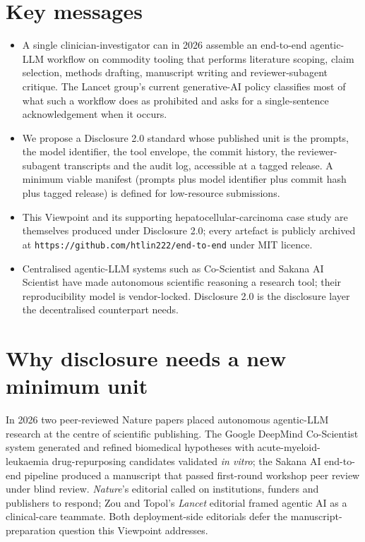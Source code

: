 \documentclass[11pt,a4paper]{article}
\begin{document}
\section*{Key messages}
\begin{tcolorbox}[colback=gray!5,colframe=gray!40,boxsep=2pt,left=6pt,right=6pt,top=4pt,bottom=4pt]
\begin{itemize}\setlength\itemsep{0.1em}
  \item A single clinician-investigator can in 2026 assemble an end-to-end agentic-LLM workflow on commodity tooling that performs literature scoping, claim selection, methods drafting, manuscript writing and reviewer-subagent critique. The Lancet group's current generative-AI policy classifies most of what such a workflow does as prohibited and asks for a single-sentence acknowledgement when it occurs.
  \item We propose a Disclosure 2.0 standard whose published unit is the prompts, the model identifier, the tool envelope, the commit history, the reviewer-subagent transcripts and the audit log, accessible at a tagged release. A minimum viable manifest (prompts plus model identifier plus commit hash plus tagged release) is defined for low-resource submissions.
  \item This Viewpoint and its supporting hepatocellular-carcinoma case study are themselves produced under Disclosure 2.0; every artefact is publicly archived at \texttt{https://github.com/htlin222/end-to-end} under MIT licence.
  \item Centralised agentic-LLM systems such as Co-Scientist\citep{coscientist2026} and Sakana AI Scientist\citep{luSakana2026} have made autonomous scientific reasoning a research tool; their reproducibility model is vendor-locked. Disclosure 2.0 is the disclosure layer the decentralised counterpart needs.
\end{itemize}
\end{tcolorbox}

\section{Why disclosure needs a new minimum unit}\label{sec:opening}

In 2026 two peer-reviewed Nature papers placed autonomous agentic-LLM research at the centre of scientific publishing. The Google DeepMind Co-Scientist system\citep{coscientist2026} generated and refined biomedical hypotheses with acute-myeloid-leukaemia drug-repurposing candidates validated \textit{in vitro}; the Sakana AI end-to-end pipeline\citep{luSakana2026} produced a manuscript that passed first-round workshop peer review under blind review. \textit{Nature}'s editorial called on institutions, funders and publishers to respond\citep{natureEditorial2026}; Zou and Topol's \textit{Lancet} editorial framed agentic AI as a clinical-care teammate\citep{zouAgentic2025}. Both deployment-side editorials defer the manuscript-preparation question this Viewpoint addresses.
\end{document}
